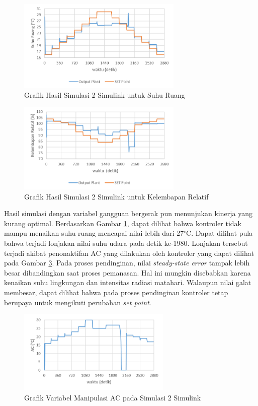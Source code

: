 \begin{figure}[!h]
	\centering
	\includegraphics[width=0.7\textwidth]{figures/Simulink2Td}
	\caption{Grafik Hasil Simulasi 2 Simulink untuk Suhu Ruang}
	\label{fig:5:Simulink2Td}
\end{figure}

\begin{figure}[!h]
	\centering
	\includegraphics[width=0.7\textwidth]{figures/Simulink2RH}
	\caption{Grafik Hasil Simulasi 2 Simulink untuk Kelembapan Relatif}
	\label{fig:5:Simulink2RH}
\end{figure}

Hasil simulasi dengan variabel gangguan bergerak pun menunjukan kinerja yang kurang optimal. Berdasarkan Gambar \ref{fig:5:Simulink2Td}, dapat dilihat bahwa kontroler tidak mampu menaikan suhu ruang mencapai nilai lebih dari 27$^\circ$C. Dapat dilihat pula bahwa terjadi lonjakan nilai suhu udara pada detik ke-1980. Lonjakan tersebut terjadi akibat penonaktifan AC yang dilakukan oleh kontroler yang dapat dilihat pada Gambar \ref{fig:5:Simulink2AC}. Pada proses pendinginan, nilai \textit{steady-state error} tampak lebih besar dibandingkan saat proses pemanasan. Hal ini mungkin disebabkan karena kenaikan suhu lingkungan dan intensitas radiasi matahari. Walaupun nilai galat membesar, dapat dilihat bahwa pada proses pendinginan kontroler tetap berupaya untuk mengikuti perubahan \textit{set point}.

\begin{figure}[!h]
	\centering
	\includegraphics[width=0.65\textwidth]{figures/Simulink2AC}
	\caption{Grafik Variabel Manipulasi AC pada Simulasi 2 Simulink}
	\label{fig:5:Simulink2AC}
\end{figure}

